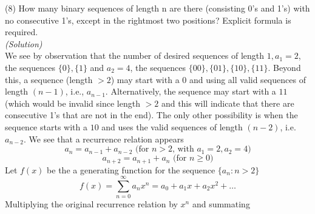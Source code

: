 (8) How many binary sequences of length n are there (consisting 0’s and 1’s)
    with no consecutive 1’s, except in the rightmost two positions? Explicit
    formula is required.\\

    \textit{(Solution)}\\

    We see by observation that the number of desired sequences
    of length  $1, a_1=2$, the sequences $\{0\},\{1\}$ and 
    $a_2=4$, the sequences $\{00\},\{01\},\{10\},\{11\}$. Beyond
    this, a sequence (length $> 2$) may start with a $0$ and using
    all valid sequences of length $(n-1)$, i.e., $a_{n-1}$. Alternatively,
    the sequence may start with a $11$ (which would be invalid since
    length $>2$ and this will indicate that there are consecutive 1's
    that are not in the end). The only other possibility is when the 
    sequence starts with a $10$ and uses the valid sequences of length
    $(n-2)$, i.e. $a_{n-2}$. We see that a recurrence relation appears
    \begin{equation*}
        a_n = a_{n-1} + a_{n-2}
        \text{ (for $n > 2$, with $a_1=2, a_2=4$)}
    \end{equation*}
    \begin{equation*}
        a_{n+2} = a_{n+1} + a_{n}
        \text{ (for $n \ge 0$)}
    \end{equation*}
    Let $f(x)$ be the a generating function for the sequence 
    $\{a_n:n>2\}$
    \begin{equation*}
        f(x) = \sum_{n=0}^{\infty}a_nx^n = a_0 + a_1x + a_2x^2 + \dots
    \end{equation*}
    Multiplying the original recurrence relation by $x^n$
    and summating

